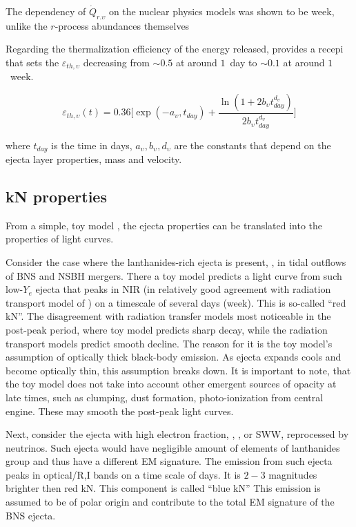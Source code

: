 The dependency of $\dot{Q}_{r.\upsilon}$ on the nuclear physics models was shown to be week, unlike the $r$-process abundances themselves \citep{Eichler:2014kma,Wu:2016pnw,Mumpower:2015ova}

Regarding the thermalization efficiency of the energy released, \citep{Barnes:2016umi} provides a recepi that sets the $\varepsilon_{th,\upsilon}$ decreasing from $\sim0.5$ at around $1$~day to $\sim0.1$ at around $1$~week. 

\begin{equation}
\varepsilon_{th,\upsilon}(t) = 0.36 \Bigg[ \exp(-a_{\upsilon}, t_{day}) + \frac{\ln(1+2b_{\upsilon} t_{day}^{d_{\upsilon}})}{2b_{\upsilon}t_{day}^{d_{\upsilon}}} \Bigg]
\end{equation}

where $t_{day}$ is the time in days, ${a_{\upsilon}, b_{\upsilon}, d_{\upsilon}}$ are the constants that depend on the ejecta layer properties, mass and velocity. 


\subsection{\ac{kN} properties}

From a simple, toy model \citep{Metzger:2016pju}, the ejecta properties can be translated 
into the properties of light curves. 

Consider the case where the lanthanides-rich ejecta is present, \eg, in tidal outflows of \ac{BNS} and \ac{NSBH} mergers.
There a toy model predicts a light curve from such low-$Y_e$ ejecta that peaks in \ac{NIR} (in relatively good agreement with radiation transport model of \cite{Barnes:2016umi}) on a timescale of several days (week). This is so-called ``red \ac{kN}''.
The disagreement with radiation transfer models most noticeable in the post-peak period, where toy model predicts sharp decay, while the radiation transport models predict smooth decline. The reason for it is the toy model's assumption of optically thick black-body emission. As ejecta expands cools and become optically thin, this assumption breaks down.
It is important to note, that the toy model does not take into account other emergent sources of opacity at late times, such as clumping, dust formation, photo-ionization from central engine. These may smooth the post-peak light curves.

Next, consider the ejecta with high electron fraction, \eg, \nwind, or \ac{SWW}, reprocessed by neutrinos.
Such ejecta would have negligible amount of elements of lanthanides group \citep{Metzger:2014ila} and thus have a different EM signature.
The emission from such ejecta peaks in optical/R,I bands on a time scale of days. It is $2-3$ magnitudes brighter then red \ac{kN}. This component is called ``blue \ac{kN}''
This emission is assumed to be of polar origin and contribute to the total \ac{EM} signature of the BNS ejecta. 


